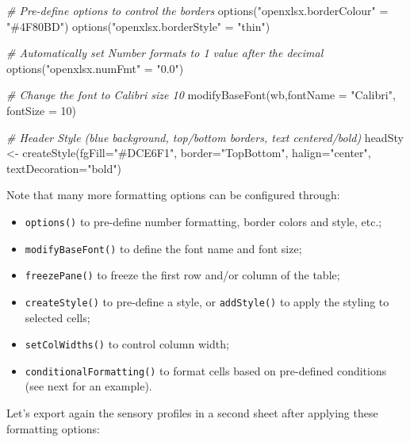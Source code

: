 \documentclass[
]{krantz}
\makeatletter
\newenvironment{Shaded}{\begin{snugshade}}{\end{snugshade}}
\newcommand{\AttributeTok}[1]{\textcolor[rgb]{0.61,0.61,0.61}{#1}}
\newcommand{\CommentTok}[1]{\textcolor[rgb]{0.37,0.37,0.37}{\textit{#1}}}
\newcommand{\DecValTok}[1]{\textcolor[rgb]{0.06,0.06,0.06}{#1}}
\newcommand{\FunctionTok}[1]{\textcolor[rgb]{0,0,0}{#1}}
\newcommand{\NormalTok}[1]{#1}
\newcommand{\OtherTok}[1]{\textcolor[rgb]{0.37,0.37,0.37}{#1}}
\newcommand{\StringTok}[1]{\textcolor[rgb]{0.5,0.5,0.5}{#1}}
\providecommand{\tightlist}{%
  \setlength{\itemsep}{0pt}\setlength{\parskip}{0pt}}
\newenvironment{kframe}{%
\medskip{}
\setlength{\fboxsep}{.8em}
 \def\at@end@of@kframe{}%
 \ifinner\ifhmode%
  \def\at@end@of@kframe{\end{minipage}}%
  \begin{minipage}{\columnwidth}%
 \fi\fi%
 \def\FrameCommand##1{\hskip\@totalleftmargin \hskip-\fboxsep
 \colorbox{shadecolor}{##1}\hskip-\fboxsep
     \hskip-\linewidth \hskip-\@totalleftmargin \hskip\columnwidth}%
 \MakeFramed {\advance\hsize-\width
   \@totalleftmargin\z@ \linewidth\hsize
   \@setminipage}}%
 {\par\unskip\endMakeFramed%
 \at@end@of@kframe}
\renewenvironment{Shaded}{\begin{kframe}}{\end{kframe}}
\makeatother
\begin{document}
\begin{Shaded}
\begin{Highlighting}[]
\CommentTok{\# Pre{-}define options to control the borders }
\FunctionTok{options}\NormalTok{(}\StringTok{"openxlsx.borderColour"} \OtherTok{=} \StringTok{"\#4F80BD"}\NormalTok{)}
\FunctionTok{options}\NormalTok{(}\StringTok{"openxlsx.borderStyle"} \OtherTok{=} \StringTok{"thin"}\NormalTok{)}

\CommentTok{\# Automatically set Number formats to 1 value after the decimal}
\FunctionTok{options}\NormalTok{(}\StringTok{"openxlsx.numFmt"} \OtherTok{=} \StringTok{"0.0"}\NormalTok{)}

\CommentTok{\# Change the font to Calibri size 10}
\FunctionTok{modifyBaseFont}\NormalTok{(wb,}\AttributeTok{fontName =} \StringTok{"Calibri"}\NormalTok{, }\AttributeTok{fontSize =} \DecValTok{10}\NormalTok{)}

\CommentTok{\# Header Style (blue background, top/bottom borders, text centered/bold)}
\NormalTok{headSty }\OtherTok{\textless{}{-}} \FunctionTok{createStyle}\NormalTok{(}\AttributeTok{fgFill=}\StringTok{"\#DCE6F1"}\NormalTok{, }\AttributeTok{border=}\StringTok{"TopBottom"}\NormalTok{, }
                       \AttributeTok{halign=}\StringTok{"center"}\NormalTok{, }\AttributeTok{textDecoration=}\StringTok{"bold"}\NormalTok{)}
\end{Highlighting}
\end{Shaded}

Note that many more formatting options can be configured through:

\begin{itemize}
\tightlist
\item
  \texttt{options()} to pre-define number formatting, border colors and style, etc.;
\item
  \texttt{modifyBaseFont()} to define the font name and font size;
\item
  \texttt{freezePane()} to freeze the first row and/or column of the table;
\item
  \texttt{createStyle()} to pre-define a style, or \texttt{addStyle()} to apply the styling to selected cells;
\item
  \texttt{setColWidths()} to control column width;
\item
  \texttt{conditionalFormatting()} to format cells based on pre-defined conditions (see next for an example).
\end{itemize}

Let's export again the sensory profiles in a second sheet after applying these formatting options:
\end{document}
